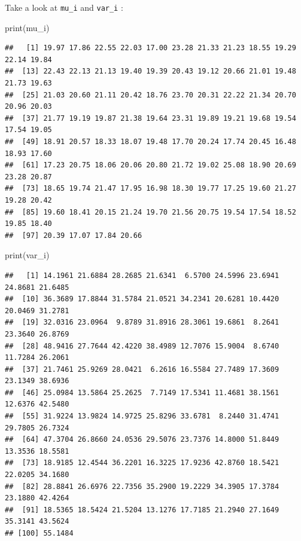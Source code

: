 \documentclass[
]{article}
\newenvironment{Shaded}{\begin{snugshade}}{\end{snugshade}}
\newcommand{\FunctionTok}[1]{\textcolor[rgb]{0.00,0.00,0.00}{#1}}
\newcommand{\NormalTok}[1]{#1}
\begin{document}
Take a look at \texttt{mu\_i} and \texttt{var\_i} :

\begin{Shaded}
\begin{Highlighting}[]
\FunctionTok{print}\NormalTok{(mu\_i)}
\end{Highlighting}
\end{Shaded}

\begin{verbatim}
##   [1] 19.97 17.86 22.55 22.03 17.00 23.28 21.33 21.23 18.55 19.29 22.14 19.84
##  [13] 22.43 22.13 21.13 19.40 19.39 20.43 19.12 20.66 21.01 19.48 21.73 19.63
##  [25] 21.03 20.60 21.11 20.42 18.76 23.70 20.31 22.22 21.34 20.70 20.96 20.03
##  [37] 21.77 19.19 19.87 21.38 19.64 23.31 19.89 19.21 19.68 19.54 17.54 19.05
##  [49] 18.91 20.57 18.33 18.07 19.48 17.70 20.24 17.74 20.45 16.48 18.93 17.60
##  [61] 17.23 20.75 18.06 20.06 20.80 21.72 19.02 25.08 18.90 20.69 23.28 20.87
##  [73] 18.65 19.74 21.47 17.95 16.98 18.30 19.77 17.25 19.60 21.27 19.28 20.42
##  [85] 19.60 18.41 20.15 21.24 19.70 21.56 20.75 19.54 17.54 18.52 19.85 18.40
##  [97] 20.39 17.07 17.84 20.66
\end{verbatim}

\begin{Shaded}
\begin{Highlighting}[]
\FunctionTok{print}\NormalTok{(var\_i)}
\end{Highlighting}
\end{Shaded}

\begin{verbatim}
##   [1] 14.1961 21.6884 28.2685 21.6341  6.5700 24.5996 23.6941 24.8681 21.6485
##  [10] 36.3689 17.8844 31.5784 21.0521 34.2341 20.6281 10.4420 20.0469 31.2781
##  [19] 32.0316 23.0964  9.8789 31.8916 28.3061 19.6861  8.2641 23.3640 26.8769
##  [28] 48.9416 27.7644 42.4220 38.4989 12.7076 15.9004  8.6740 11.7284 26.2061
##  [37] 21.7461 25.9269 28.0421  6.2616 16.5584 27.7489 17.3609 23.1349 38.6936
##  [46] 25.0984 13.5864 25.2625  7.7149 17.5341 11.4681 38.1561 12.6376 42.5480
##  [55] 31.9224 13.9824 14.9725 25.8296 33.6781  8.2440 31.4741 29.7805 26.7324
##  [64] 47.3704 26.8660 24.0536 29.5076 23.7376 14.8000 51.8449 13.3536 18.5581
##  [73] 18.9185 12.4544 36.2201 16.3225 17.9236 42.8760 18.5421 22.0205 34.1680
##  [82] 28.8841 26.6976 22.7356 35.2900 19.2229 34.3905 17.3784 23.1880 42.4264
##  [91] 18.5365 18.5424 21.5204 13.1276 17.7185 21.2940 27.1649 35.3141 43.5624
## [100] 55.1484
\end{verbatim}
\end{document}
